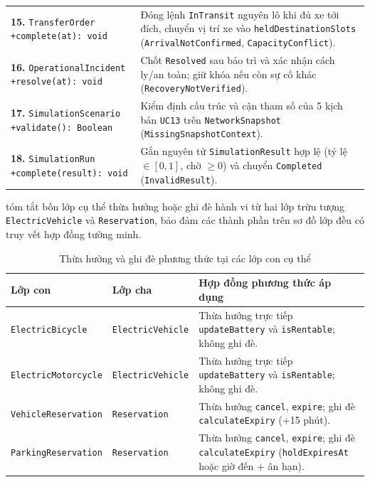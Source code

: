 {\begin{longtable}{>{\raggedright\arraybackslash}p{4.3cm} >{\raggedright\arraybackslash}p{10.0cm}}
\textbf{15.} \texttt{TransferOrder} \newline \texttt{+complete(at): void} & Đóng lệnh \texttt{InTransit} nguyên lô khi đủ xe tới đích, chuyển vị trí xe vào \texttt{heldDestinationSlots} (\texttt{ArrivalNotConfirmed}, \texttt{CapacityConflict}). \\
\textbf{16.} \texttt{OperationalIncident} \newline \texttt{+resolve(at): void} & Chốt \texttt{Resolved} sau bảo trì và xác nhận cách ly/an toàn; giữ khóa nếu còn sự cố khác (\texttt{RecoveryNotVerified}). \\
\textbf{17.} \texttt{SimulationScenario} \newline \texttt{+validate(): Boolean} & Kiểm định cấu trúc và cận tham số của 5 kịch bản \texttt{UC13} trên \texttt{NetworkSnapshot} (\texttt{MissingSnapshotContext}). \\
\textbf{18.} \texttt{SimulationRun} \newline \texttt{+complete(result): void} & Gắn nguyên tử \texttt{SimulationResult} hợp lệ (tỷ lệ $\in [0,1]$, chờ $\ge 0$) và chuyển \texttt{Completed} (\texttt{InvalidResult}). \\
\end{longtable}
}

 tóm tắt bốn lớp cụ thể thừa hưởng hoặc ghi đè hành vi từ hai lớp trừu tượng \texttt{ElectricVehicle} và \texttt{Reservation}, bảo đảm các thành phần trên sơ đồ lớp đều có truy vết hợp đồng tường minh.

\begin{table}[H]
\centering
\caption{Thừa hưởng và ghi đè phương thức tại các lớp con cụ thể}
\label{tab:inherited-methods}
\begin{tabular}{>{\raggedright\arraybackslash}p{3.4cm} >{\raggedright\arraybackslash}p{3.4cm} >{\raggedright\arraybackslash}p{7.5cm}}
\toprule
\textbf{Lớp con} & \textbf{Lớp cha} & \textbf{Hợp đồng phương thức áp dụng} \\
\midrule
\texttt{ElectricBicycle} & \texttt{ElectricVehicle} & Thừa hưởng trực tiếp \texttt{updateBattery} và \texttt{isRentable}; không ghi đè. \\
\texttt{ElectricMotorcycle} & \texttt{ElectricVehicle} & Thừa hưởng trực tiếp \texttt{updateBattery} và \texttt{isRentable}; không ghi đè. \\
\texttt{VehicleReservation} & \texttt{Reservation} & Thừa hưởng \texttt{cancel}, \texttt{expire}; ghi đè \texttt{calculateExpiry} (+15 phút). \\
\texttt{ParkingReservation} & \texttt{Reservation} & Thừa hưởng \texttt{cancel}, \texttt{expire}; ghi đè \texttt{calculateExpiry} (\texttt{holdExpiresAt} hoặc giờ đến + ân hạn). \\
\bottomrule
\end{tabular}
\end{table}

